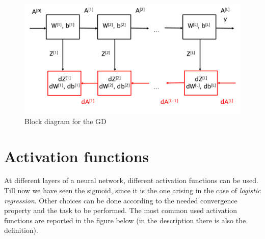 \begin{figure}[h]
    \centering
    \includegraphics[scale=0.5]{img/block_diagram_GD.png}
    \caption{Block diagram for the GD}
\end{figure}

\section{Activation functions}
At different layers of a neural network, different activation functions can be used. Till now we have seen the sigmoid, since it is the one arising in the case of \textit{logistic regression}. Other choices can be done according to the needed convergence property and the task to be performed. The most common used activation functions are reported in the figure below (in the description there is also the definition).

